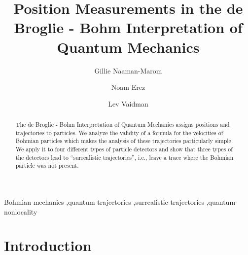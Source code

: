 \documentclass[preprint,tightenlines]{elsarticle}
\begin{document}
\begin{frontmatter}

\title{Position Measurements in the de Broglie - Bohm Interpretation of
Quantum Mechanics}

\author{Gillie Naaman-Marom}
\author{Noam Erez}
\author{Lev Vaidman}
\address{Raymond and Beverly Sackler School of Physics and Astronomy\\
 Tel-Aviv University, Tel-Aviv 69978, Israel}


\begin{abstract}
The de Broglie - Bohm Interpretation of Quantum Mechanics assigns positions and
trajectories to particles.
We analyze the validity of a formula for the velocities
 of Bohmian  particles which makes the analysis of these
trajectories particularly simple. We apply it to four different types
of particle detectors and show that three types of the detectors lead
to ``surrealistic trajectories'', i.e., leave a trace where the Bohmian
particle was not present.
\end{abstract}

\begin{keyword}
Bohmian mechanics \sep quantum trajectories \sep surrealistic trajectories \sep quantum nonlocality
\end{keyword}

\end{frontmatter}

\section{ Introduction}

\label{intr}
\end{document}
